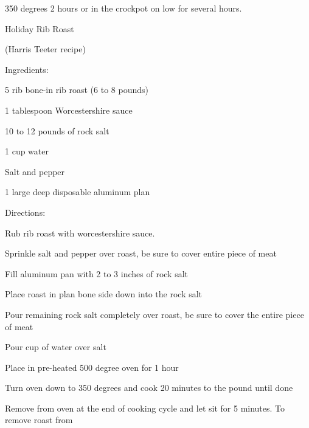 \documentclass[a4paper,portrait,12pt]{book}
\begin{document}
350 degrees 2 hours or in the crockpot on low for several hours.







\newpage
Holiday Rib Roast




(Harris Teeter recipe)




Ingredients:




5 rib bone-in rib roast (6 to 8 pounds)




1 tablespoon Worcestershire sauce




10 to 12 pounds of rock salt




1 cup water




Salt and pepper




1 large deep disposable aluminum plan




Directions:




Rub rib roast with worcestershire sauce.




Sprinkle salt and pepper over roast, be sure to cover entire piece of meat




Fill aluminum pan with 2 to 3 inches of rock salt




Place roast in plan bone side down into the rock salt




Pour remaining rock salt completely over roast, be sure to cover the entire piece of meat




Pour cup of water over salt




Place in pre-heated 500 degree oven for 1 hour




Turn oven down to 350 degrees and cook 20 minutes to the pound until done




Remove from oven at the end of cooking cycle and let sit for 5 minutes. To remove roast from
\end{document}
